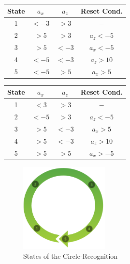 \begin{minipage}{0.45\textwidth}
\footnotesize
\begin{tabular}{c|c|c|c}
State & $a_x$ & $a_z$ & Reset Cond. \\
\hline
1 & $< -3$ & $> 3$ & $-$\\
2 & $> 5$ & $> 3$ & $a_z < -5$ \\
3 & $> 5$ & $< -3$ & $a_x < -5$ \\
4 & $< -5$ & $< -3$ & $a_z > 10$ \\
5 & $< -5$ & $> 5$ & $a_x > 5$  
\end{tabular}
\label{tab:milestonesCw}
\end{minipage}\hspace{0.1\textwidth}
\begin{minipage}{0.45\textwidth}
\footnotesize
\begin{tabular}{c|c|c|c}
State & $a_x$ & $a_z$ & Reset Cond. \\
\hline
1 & $< 3$ & $> 3$ & $-$\\
2 & $< -5$ & $> 3$ & $a_z < -5$ \\
3 & $> 5$ & $< -3$ & $a_x > 5$ \\
4 & $> 5$ & $< -3$ & $a_z > 10$ \\
5 & $> 5$ & $> 5$ & $a_x > -5$  
\end{tabular}
\label{tab:milestonesCcw}
\end{minipage}

\begin{figure}
\centering
\captionsetup{justification=centering}
\includegraphics[width=0.4\textwidth]{res/gestures/circleMilestones.png}
\caption{States of the Circle-Recognition}
\label{fig:circleStates}
\end{figure}